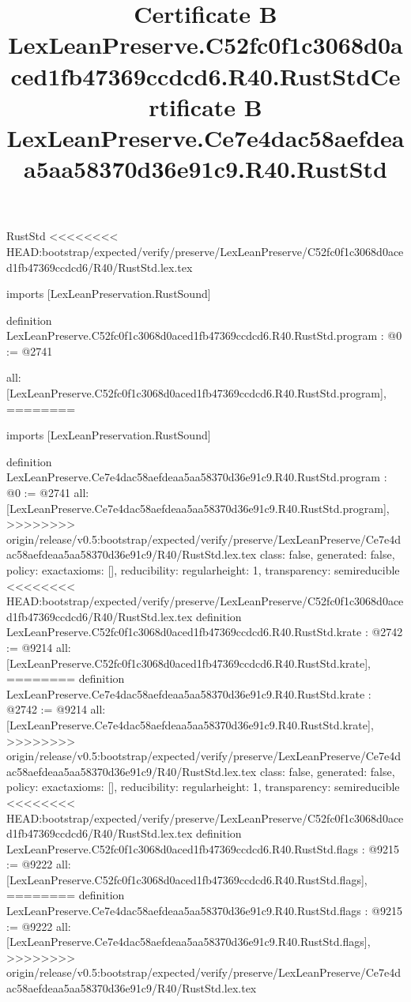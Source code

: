 \begin{lexlean}{RustStd}
<<<<<<<< HEAD:bootstrap/expected/verify/preserve/LexLeanPreserve/C52fc0f1c3068d0aced1fb47369ccdcd6/R40/RustStd.lex.tex
\title{Certificate B LexLeanPreserve.C52fc0f1c3068d0aced1fb47369ccdcd6.R40.RustStd}
\begin{coremodule}
imports [LexLeanPreservation.RustSound]

definition LexLeanPreserve.C52fc0f1c3068d0aced1fb47369ccdcd6.R40.RustStd.program : @0 := @2741 {
  all: [LexLeanPreserve.C52fc0f1c3068d0aced1fb47369ccdcd6.R40.RustStd.program],
========
\title{Certificate B LexLeanPreserve.Ce7e4dac58aefdeaa5aa58370d36e91c9.R40.RustStd}
\begin{coremodule}
imports [LexLeanPreservation.RustSound]

definition LexLeanPreserve.Ce7e4dac58aefdeaa5aa58370d36e91c9.R40.RustStd.program : @0 := @2741 {
  all: [LexLeanPreserve.Ce7e4dac58aefdeaa5aa58370d36e91c9.R40.RustStd.program],
>>>>>>>> origin/release/v0.5:bootstrap/expected/verify/preserve/LexLeanPreserve/Ce7e4dac58aefdeaa5aa58370d36e91c9/R40/RustStd.lex.tex
  class: false,
  generated: false,
  policy: exact{axioms: []},
  reducibility: regular{height: 1},
  transparency: semireducible
}
<<<<<<<< HEAD:bootstrap/expected/verify/preserve/LexLeanPreserve/C52fc0f1c3068d0aced1fb47369ccdcd6/R40/RustStd.lex.tex
definition LexLeanPreserve.C52fc0f1c3068d0aced1fb47369ccdcd6.R40.RustStd.krate : @2742 := @9214 {
  all: [LexLeanPreserve.C52fc0f1c3068d0aced1fb47369ccdcd6.R40.RustStd.krate],
========
definition LexLeanPreserve.Ce7e4dac58aefdeaa5aa58370d36e91c9.R40.RustStd.krate : @2742 := @9214 {
  all: [LexLeanPreserve.Ce7e4dac58aefdeaa5aa58370d36e91c9.R40.RustStd.krate],
>>>>>>>> origin/release/v0.5:bootstrap/expected/verify/preserve/LexLeanPreserve/Ce7e4dac58aefdeaa5aa58370d36e91c9/R40/RustStd.lex.tex
  class: false,
  generated: false,
  policy: exact{axioms: []},
  reducibility: regular{height: 1},
  transparency: semireducible
}
<<<<<<<< HEAD:bootstrap/expected/verify/preserve/LexLeanPreserve/C52fc0f1c3068d0aced1fb47369ccdcd6/R40/RustStd.lex.tex
definition LexLeanPreserve.C52fc0f1c3068d0aced1fb47369ccdcd6.R40.RustStd.flags : @9215 := @9222 {
  all: [LexLeanPreserve.C52fc0f1c3068d0aced1fb47369ccdcd6.R40.RustStd.flags],
========
definition LexLeanPreserve.Ce7e4dac58aefdeaa5aa58370d36e91c9.R40.RustStd.flags : @9215 := @9222 {
  all: [LexLeanPreserve.Ce7e4dac58aefdeaa5aa58370d36e91c9.R40.RustStd.flags],
>>>>>>>> origin/release/v0.5:bootstrap/expected/verify/preserve/LexLeanPreserve/Ce7e4dac58aefdeaa5aa58370d36e91c9/R40/RustStd.lex.tex
}}}
\end{coremodule}}
\end{coremodule}
\end{lexlean}
